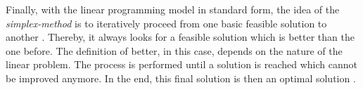 Finally, with the linear programming model in standard form, the idea of the \textit{simplex-method}
is to iteratively proceed from one basic feasible solution to another .
Thereby, it always looks for a feasible solution which is better than the one before. 
The definition of better, in this case, depends on the nature of the linear problem. 
The process is performed until a solution is reached which cannot 
be improved anymore. In the end, this final solution is then an optimal solution . 


\clearpage




